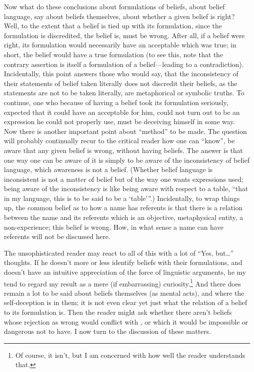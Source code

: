Now what do these conclusions about formulations of beliefs, about belief language, say about beliefs themselves, about whether a given belief is right? Well, to the extent that a belief is tied up with its formulation, since the formulation is discredited, the belief is, must be wrong. After all, if a belief were right, its formulation would necessarily have an acceptable  which was true; in short, the belief would have a true formulation (to see this, note that the contrary assertion is itself a formulation of a belief---leading to a contradiction). Incidentally, this point answers those who would say, that the inconsistency of their statements of belief taken literally does not discredit their beliefs, as the statements are not to be taken literally, are metaphorical or symbolic truths. To continue, one who because of having a belief took its formulation seriously, expected that it could have an acceptable  for him, could not turn out to be an expression he could not properly use, must be deceiving himself in some way. Now there is another important point about \enquote{method} to be made. The question will probably continually recur to the critical reader how one can \enquote{know}, be aware that any given belief is wrong, without having beliefs. The answer is that one way one can be aware of it is simply to be aware of the inconsistency of belief language, which awareness is not a belief. (Whether belief language is inconsistent is not a matter of belief but of the way one wants expressions used; being aware of the inconsistency is like being aware with respect to a table, \enquote{that in my language, this is to be said to be a \enquote{table}}.) Incidentally, to wrap things up, the common belief as to how a name has referents is that there is a relation between the name and its referents which is an objective, metaphysical entity, a non-experience; this belief is wrong. How, in what sense a name can have referents will not be discussed here. 

The unsophisticated reader may react to all of this with a lot of \enquote{Yes, but\ldots} thoughts. If he doesn't more or less identify beliefs with their formulations, and doesn't have an intuitive appreciation of the force of linguistic arguments, he my tend to regard my result as a mere (if embarrassing) curiosity.\footnote{Of course, it isn't, but I am concerned with how well the reader understands that.} And there does remain a lot to be said about beliefs themselves (as mental acts), and where the self-deception is in them; it is not even clear yet just what the relation of a belief to its formulation is. Then the reader might ask whether there aren't beliefs whose rejection as wrong would conflict with , or which it would be impossible or dangerous not to have. I now turn to the discussion of these matters. 

